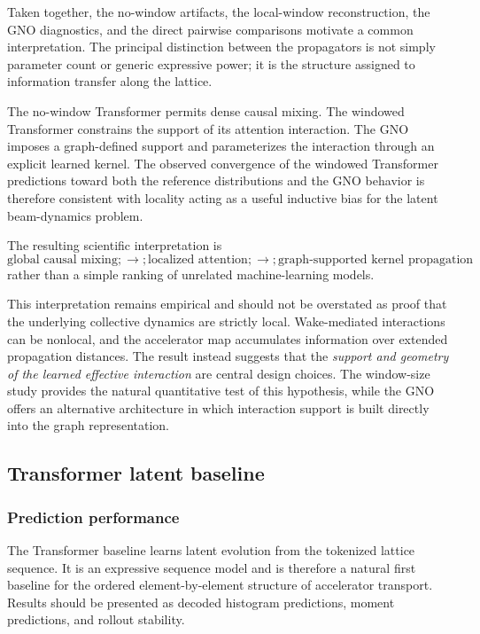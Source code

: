 Taken together, the no-window artifacts, the local-window reconstruction, the GNO diagnostics, and the direct pairwise comparisons motivate a common interpretation. The principal distinction between the propagators is not simply parameter count or generic expressive power; it is the structure assigned to information transfer along the lattice.

The no-window Transformer permits dense causal mixing. The windowed Transformer constrains the support of its attention interaction. The GNO imposes a graph-defined support and parameterizes the interaction through an explicit learned kernel. The observed convergence of the windowed Transformer predictions toward both the reference distributions and the GNO behavior is therefore consistent with locality acting as a useful inductive bias for the latent beam-dynamics problem.

The resulting scientific interpretation is
\begin{equation}
\boxed{
\text{global causal mixing}
;\longrightarrow;
\text{localized attention}
;\longrightarrow;
\text{graph-supported kernel propagation}
}
\label{eq:locality_synthesis_results}
\end{equation}
rather than a simple ranking of unrelated machine-learning models.

This interpretation remains empirical and should not be overstated as proof that the underlying collective dynamics are strictly local. Wake-mediated interactions can be nonlocal, and the accelerator map accumulates information over extended propagation distances. The result instead suggests that the \emph{support and geometry of the learned effective interaction} are central design choices. The window-size study provides the natural quantitative test of this hypothesis, while the GNO offers an alternative architecture in which interaction support is built directly into the graph representation.


\subsection{Transformer latent baseline}
\subsubsection{Prediction performance}
The Transformer baseline learns latent evolution from the tokenized lattice sequence. It is an expressive sequence model and is therefore a natural first baseline for the ordered element-by-element structure of accelerator transport. Results should be presented as decoded histogram predictions, moment predictions, and rollout stability.

